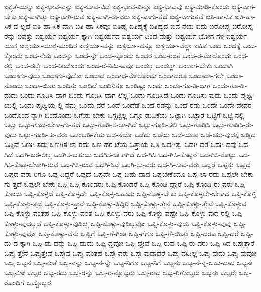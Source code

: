 {ಐಕ್ಯತೆ-ಯನ್ನು
ಐಕ್ಯ-ಭಾವ-ವನ್ನು
ಐಕ್ಯ-ಭಾವ-ವಿದೆ
ಐಕ್ಯ-ಭಾವ-ವಿನ್ನೂ
ಐಕ್ಯ-ಭಾವವು
ಐಕ್ಯ-ಮಾಡಿ-ಕೊಂಡು
ಐಕ್ಯ-ವಾಗ-ಬೇಕು
ಐಕ್ಯ-ವಾಗಿತ್ತು
ಐಕ್ಯ-ವಾಗಿ-ರುವ
ಐಕ್ಯ-ವಾಗಿ-ರು-ವರು
ಐಕ್ಯ-ವಾಗು-ತ್ತದೆ
ಐಕ್ಯ-ವಾಗುತ್ತವೆ
ಐತಿ-ಹಾ-ಸಿಕ
ಐತಿ-ಹಾ-ಸಿಕ-ವ-ಲ್ಲದೆ
ಐತಿ-ಹಾ-ಸಿಕ-ವಾಗಿ
ಐತಿ-ಹಾ-ಸಿಕವೂ
ಐತಿಹ್ಯ
ಐತಿಹ್ಯಕ್ಕೆ
ಐತಿಹ್ಯದ
ಐದ-ನೆಯ
ಐದು
ಐರೋಪ್ಯ
ಐರೋಪ್ಯ-ರನ್ನು
ಐವತ್ತು
ಐಶ್ವರ್ಯ
ಐಶ್ವರ್ಯ-ಕ್ಕಾಗಿ
ಐಶ್ವರ್ಯದ
ಐಶ್ವರ್ಯ-ದಿಂದ-ಮತ್ತು
ಐಶ್ವರ್ಯ-ಭೋಗ-ಗಳ
ಐಶ್ವರ್ಯ-ಯುಕ್ತ
ಐಶ್ವರ್ಯ-ಯುಕ್ತ-ಮಂದಿರ
ಐಶ್ವರ್ಯ-ವನ್ನು
ಐಶ್ವರ್ಯ-ವನ್ನೂ
ಐಶ್ವರ್ಯ-ವೆಲ್ಲಾ
ಐಹಿಕ
ಒಂದ
ಒಂದಕ್ಕೆ
ಒಂದ-ಕ್ಕೊಂದು
ಒಂದ-ನೆಯ
ಒಂದನ್ನು
ಒಂದ-ನ್ನೇ
ಒಂದ-ನ್ನೊಂದು
ಒಂದರ
ಒಂದ-ರಂತೆ
ಒಂದ-ರ-ಮೇಲೊಂದು
ಒಂದ-ರಲ್ಲಿ
ಒಂದ-ರಲ್ಲೇ
ಒಂದ-ರಿಂದೊಂದು
ಒಂದ-ರೆ-ನಿಮಿ-ಷವೂ
ಒಂದಲ್ಲ
ಒಂದಲ್ಲಾ
ಒಂದಾಗ-ಬೇಕು
ಒಂದಾಗಿ
ಒಂದಾಗು-ವುದು
ಒಂದಾಗು-ವುದೋ
ಒಂದಾದ
ಒಂದಾದ-ಮೇಲೊಂದು
ಒಂದಾದರೂ
ಒಂದಾದಾ-ಗಲೇ
ಒಂದಾ-ನೊಂದು
ಒಂದಾ-ಯಿತು
ಒಂದಿತ್ತು
ಒಂದಿದೆ
ಒಂದಿನಿತೂ
ಒಂದಿಷ್ಟು
ಒಂದು
ಒಂದು-ಗೂ-ಡಿ-ದಾಗ
ಒಂದು-ಗೂ-ಡಿ-ದುದು
ಒಂದು-ಗೂಡಿಸಿ-ದಾಗ
ಒಂದು-ಗೂಡಿಸಿ-ದಾಗ-ಲೆಲ್ಲ
ಒಂದು-ಗೂಡಿಸಿದೆ
ಒಂದು-ಗೂಡಿಸು-ವುದು
ಒಂದು-ಪೃಥ್ವಿ-ಯಲ್ಲಿ
ಒಂದು-ಪೃಥ್ವಿಯ-ಲ್ಲಿ-ನಮ್ಮ
ಒಂದು-ವರೆ
ಒಂದೆ
ಒಂದೆಡೆ
ಒಂದೆ-ರಡನ್ನು
ಒಂದೆ-ರಡು
ಒಂದೇ
ಒಂದೇ-ದೇವರ
ಒಂದೊಂದ-ನ್ನಾಗಿ
ಒಂದೊಂದು
ಒಗೆಯ-ಬೇಕು
ಒಗ್ಗಟ್ಟಿಲ್ಲ
ಒಗ್ಗೂ-ಡುವಿಕೆಯ
ಒಟ್ಟಾಗಿ
ಒಟ್ಟಾರೆ
ಒಟ್ಟಿಗೆ
ಒಟ್ಟಿ-ನಲ್ಲಿ
ಒಟ್ಟು
ಒಟ್ಟು-ಗೂಡ-ಬೇಕಾ-ಗು-ತ್ತದೆ
ಒಟ್ಟು-ಗೂಡಿ-ಸ-ಲಾ-ಗಿದೆ
ಒಟ್ಟು-ಗೂಡಿ-ಸಲಿ
ಒಟ್ಟು-ಗೂಡಿಸಿ
ಒಟ್ಟು-ಗೂಡಿಸಿ-ರು-ವುದು
ಒಟ್ಟು-ಗೂಡಿ-ಸು-ವರು
ಒಡಂಬಡಿ-ಕೆಯ
ಒಡ-ನೆಯೇ
ಒಡೆದು
ಒಡೆಯ
ಒಡೆ-ಯುವ
ಒಡೆ-ಯು-ವುದಕ್ಕೆ
ಒಡ್ಡಿದ
ಒಡ್ಡಿವೆ
ಒಣಗಿ-ಸದು
ಒಣಗಿಸ-ಲಾ-ರದು
ಒಣ-ಹರ-ಟೆಯ
ಒತ್ತಾಯ
ಒತ್ತಿ
ಒದಗಿತ್ತು
ಒದಗಿ-ದರೆ
ಒದಗಿ-ದವು
ಒದ-ಗಿದೆ
ಒದಗಿ-ಬರ-ಲಿಲ್ಲ
ಒದಗಿಸ-ಬಹುದು
ಒದಗಿಸ-ಬೇಕಾಗಿದೆ
ಒದ-ಗಿಸಿ
ಒದ-ಗಿಸಿ-ಕೊಟ್ಟರೆ
ಒದ-ಗಿಸಿ-ಕೊಟ್ಟು
ಒದ-ಗಿಸಿ-ಕೊಡ-ಬೇಕಾಗಿ-ರುವ
ಒದ-ಗಿಸಿ-ರುವ
ಒದಗಿ-ಸಿವೆ
ಒದಗಿ-ಸು-ವರು
ಒದ-ಗಿ-ಸುವ-ವರು
ಒದ್ದರೆ
ಒಪ್ಪತ್ತು
ಒಪ್ಪದ
ಒಪ್ಪದ-ವರಾ-ರಿಗೂ
ಒಪ್ಪ-ದಿದ್ದರೆ
ಒಪ್ಪದೆ
ಒಪ್ಪದೇ
ಒಪ್ಪ-ಬಹು-ದಾದ
ಒಪ್ಪಬೇಕೆಂದೂ
ಒಪ್ಪ-ಲಾ-ರದು
ಒಪ್ಪಲೇ-ಬೇಕಾ-ಗು-ತ್ತದೆ
ಒಪ್ಪಲೇ-ಬೇಕು
ಒಪ್ಪಿ
ಒಪ್ಪಿ-ಕೊಂಡರು
ಒಪ್ಪಿ-ಕೊಂಡರೆ
ಒಪ್ಪಿ-ಕೊಂಡಿ-ದ್ದಾರೆ
ಒಪ್ಪಿ-ಕೊಂಡಿ-ರು-ವರು
ಒಪ್ಪಿ-ಕೊಂಡು
ಒಪ್ಪಿ-ಕೊಳ್ಳದೆ
ಒಪ್ಪಿ-ಕೊಳ್ಳದೇ
ಒಪ್ಪಿ-ಕೊಳ್ಳ-ಬಹುದು
ಒಪ್ಪಿ-ಕೊಳ್ಳ-ಬೇಕು
ಒಪ್ಪಿ-ಕೊಳ್ಳಲೇ-ಬೇಕಾದ
ಒಪ್ಪಿ-ಕೊಳ್ಳಿ
ಒಪ್ಪಿ-ಕೊಳ್ಳು-ತ್ತದೆ
ಒಪ್ಪಿ-ಕೊಳ್ಳು-ತ್ತಾರೆ
ಒಪ್ಪಿ-ಕೊಳ್ಳು-ತ್ತಿದ್ದಿರಿ
ಒಪ್ಪಿ-ಕೊಳ್ಳು-ತ್ತೇನೆ
ಒಪ್ಪಿ-ಕೊಳ್ಳು-ತ್ತೇವೆ
ಒಪ್ಪಿ-ಕೊಳ್ಳುವ
ಒಪ್ಪಿ-ಕೊಳ್ಳು-ವಂತಹ
ಒಪ್ಪಿ-ಕೊಳ್ಳು-ವಂತೆ
ಒಪ್ಪಿ-ಕೊಳ್ಳು-ವರು
ಒಪ್ಪಿ-ಕೊಳ್ಳು-ವಷ್ಟೇ
ಒಪ್ಪಿ-ಕೊಳ್ಳು-ವುದ-ರಲ್ಲಿ
ಒಪ್ಪಿ-ಕೊಳ್ಳು-ವುದಲ್ಲದೆ
ಒಪ್ಪಿ-ಕೊಳ್ಳು-ವುದಿಲ್ಲ
ಒಪ್ಪಿ-ಕೊಳ್ಳು-ವುದಿಲ್ಲವೋ
ಒಪ್ಪಿ-ಕೊಳ್ಳು-ವುದು
ಒಪ್ಪಿ-ಕೊಳ್ಳು-ವುವು
ಒಪ್ಪಿ-ಕೊಳ್ಳು-ವುವೋ
ಒಪ್ಪಿ-ಕೊಳ್ಳು-ವೆನು
ಒಪ್ಪಿಗೆ
ಒಪ್ಪಿ-ಗೆ-ಗಿಂತ
ಒಪ್ಪಿ-ಗೆಗೂ
ಒಪ್ಪಿ-ಗೆ-ಯಿತ್ತು
ಒಪ್ಪಿ-ದರೂ
ಒಪ್ಪಿ-ದರೆ
ಒಪ್ಪಿ-ದು-ದ-ಕ್ಕಾಗಿ
ಒಪ್ಪಿ-ದು-ದನ್ನು
ಒಪ್ಪಿ-ದುದು
ಒಪ್ಪಿ-ದ್ದವೋ
ಒಪ್ಪಿ-ದ್ದೇವೆ
ಒಪ್ಪಿ-ರುವ
ಒಪ್ಪಿ-ರು-ವರು
ಒಪ್ಪಿ-ಸಿದ
ಒಪ್ಪುತ್ತಾರೆ
ಒಪ್ಪು-ತ್ತೇನೆ
ಒಪ್ಪುತ್ತೇವೆ
ಒಪ್ಪುವ
ಒಪ್ಪು-ವಂತಹ
ಒಪ್ಪು-ವರು
ಒಪ್ಪು-ವುದಾದರೆ
ಒಪ್ಪು-ವುದಿಲ್ಲ
ಒಪ್ಪು-ವುದು
ಒಪ್ಪು-ವುವೋ
ಒಬ್ಬ
ಒಬ್ಬನ
ಒಬ್ಬ-ನಂತೆ
ಒಬ್ಬ-ನನ್ನು
ಒಬ್ಬ-ನ-ನ್ನೇ
ಒಬ್ಬ-ನಿಗೂ
ಒಬ್ಬ-ನಿಗೆ
ಒಬ್ಬನು
ಒಬ್ಬ-ನೆ-ನ್ನ-ಬಹು-ದಾದ
ಒಬ್ಬನೇ
ಒಬ್ಬನೋ
ಒಬ್ಬರ
ಒಬ್ಬ-ರದು
ಒಬ್ಬ-ರನ್ನು
ಒಬ್ಬ-ರ-ನ್ನೊಬ್ಬರು
ಒಬ್ಬ-ರಾದ
ಒಬ್ಬ-ರಿಗೊಬ್ಬರು
ಒಬ್ಬರು
ಒಬ್ಬರೇ
ಒಬ್ಬ-ರೊಂದಿಗೆ
ಒಬ್ಬೊಬ್ಬರ
}
